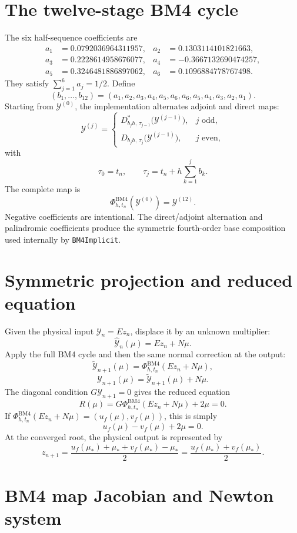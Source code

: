\documentclass[11pt,a4paper]{article}
\newcommand{\Y}{\mathcal{Y}}
\newcommand{\PhiBM}{\Phi^{\mathrm{BM4}}_{h,t_n}}
\begin{document}
\section{The twelve-stage BM4 cycle}

The six half-sequence coefficients are
\[
\begin{aligned}
 a_1&= 0.0792036964311957,&
 a_2&= 0.1303114101821663,\\
 a_3&= 0.2228614958676077,&
 a_4&=-0.3667132690474257,\\
 a_5&= 0.3246481886897062,&
 a_6&= 0.1096884778767498.
\end{aligned}
\]
They satisfy $\sum_{j=1}^6 a_j=1/2$.  Define
\[
 (b_1,\ldots,b_{12})
 =(a_1,a_2,a_3,a_4,a_5,a_6,a_6,a_5,a_4,a_3,a_2,a_1).
\]
Starting from $\Y^{(0)}$, the implementation alternates adjoint and direct
maps:
\[
 \Y^{(j)}=
 \begin{cases}
  D^*_{b_jh,\,\tau_{j-1}}\bigl(\Y^{(j-1)}\bigr),&j\text{ odd},\\
  D_{b_jh,\,\tau_j}\bigl(\Y^{(j-1)}\bigr),&j\text{ even},
 \end{cases}
\]
with
\[
 \tau_0=t_n,
 \qquad
 \tau_j=t_n+h\sum_{k=1}^j b_k.
\]
The complete map is
\[
 \boxed{\PhiBM(\Y^{(0)})=\Y^{(12)}.}
\]
Negative coefficients are intentional.  The direct/adjoint alternation and
palindromic coefficients produce the symmetric fourth-order base composition
used internally by \texttt{BM4Implicit}.

\section{Symmetric projection and reduced equation}

Given the physical input $\Y_n=Ez_n$, displace it by an unknown multiplier:
\[
 \widehat{\Y}_n(\mu)=Ez_n+N\mu.
\]
Apply the full BM4 cycle and then the same normal correction at the output:
\[
 \widetilde{\Y}_{n+1}(\mu)
 =\PhiBM(Ez_n+N\mu),
\]
\[
 \Y_{n+1}(\mu)
 =\widetilde{\Y}_{n+1}(\mu)+N\mu.
\]
The diagonal condition $G\Y_{n+1}=0$ gives the reduced equation
\[
 \boxed{
 R(\mu)
 =G\PhiBM(Ez_n+N\mu)+2\mu=0.
 } \tag{1}
\]
If $\PhiBM(Ez_n+N\mu)=(u_f(\mu),v_f(\mu))$, this is simply
\[
 u_f(\mu)-v_f(\mu)+2\mu=0.
\]
At the converged root, the physical output is represented by
\[
 \boxed{
 z_{n+1}=\frac{u_f(\mu_*)+\mu_*+v_f(\mu_*)-\mu_*}{2}
 =\frac{u_f(\mu_*)+v_f(\mu_*)}{2}.
 } \tag{2}
\]

\section{BM4 map Jacobian and Newton system}
\end{document}
